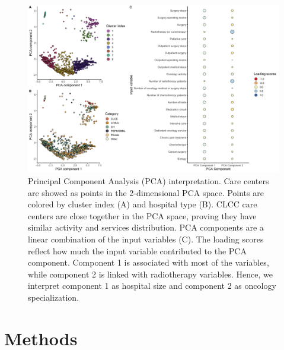 \begin{figure}[t]
    \includegraphics[width=\textwidth]{images/camion/supplemental/sup_fig1_pca_and_clustering.png}
    \centering
    \caption{
        Principal Component Analysis (PCA) interpretation. Care centers are showed as points in the 2-dimensional PCA space. Points are colored by cluster index (A) and hospital type (B). CLCC care centers are close together in the PCA space, proving they have similar activity and services distribution. PCA components are a linear combination of the input variables (C). The loading scores reflect how much the input variable contributed to the PCA component. Component 1 is associated with most of the variables, while component 2 is linked with radiotherapy variables. Hence, we interpret component 1 as hospital size and component 2 as oncology specialization.
    }
    \label{fig:clustering-pca}
\end{figure}

\section{Methods}

